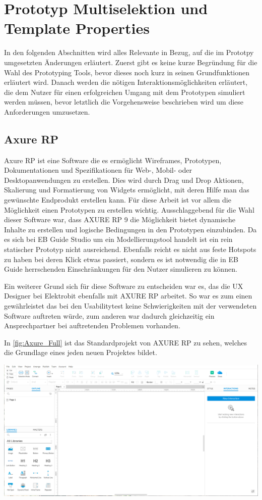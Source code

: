\section {Prototyp Multiselektion und Template Properties}
In den folgenden Abschnitten wird alles Relevante in Bezug, auf die im Prototpy umgesetzten Änderungen erläutert.
Zuerst gibt es keine kurze Begründung für die Wahl des Prototyping Tools, bevor dieses noch kurz in seinen Grundfunktionen erläutert wird.
Danach werden die nötigen Interaktionsmöglichkeiten erläutert, die dem Nutzer für einen erfolgreichen Umgang mit dem Prototypen simuliert werden müssen, bevor letztlich die Vorgehensweise beschrieben wird um diese Anforderungen umzusetzen.

\subsection {Axure RP}
Axure RP ist eine Software die es ermöglicht Wireframes, Prototypen, Dokumentationen und Spezifikationen für Web-, Mobil- oder Desktopanwendungen zu erstellen.
Dies wird durch Drag und Drop Aktionen, Skalierung und Formatierung von Widgets ermöglicht, mit deren Hilfe man das gewünschte Endprodukt erstellen kann.
Für diese Arbeit ist vor allem die Möglichkeit einen Prototypen zu erstellen wichtig.
Ausschlaggebend für die Wahl dieser Software war, dass AXURE RP 9 die Möglichkeit bietet dynamische Inhalte zu erstellen und logische Bedingungen in den Prototypen einzubinden.
Da es sich bei EB Guide Studio um ein Modellierungstool handelt ist ein rein statischer Prototyp nicht ausreichend.
Ebenfalls reicht es nicht aus feste Hotspots zu haben bei deren Klick etwas passiert, sondern es ist notwendig die in EB Guide herrschenden Einschränkungen für den Nutzer simulieren zu können.

Ein weiterer Grund sich für diese Software zu entscheiden war es, das die UX Designer bei Elektrobit ebenfalls mit AXURE RP arbeitet.
So war es zum einen gewährleistet das bei den Usabilitytest keine Schwierigkeiten mit der verwendeten Software auftreten würde, zum anderen war dadurch gleichzeitig ein Ansprechpartner bei auftretenden Problemen vorhanden.

In \cref{fig:Axure_Full} ist das Standardprojekt von AXURE RP zu sehen, welches die Grundlage eines jeden neuen Projektes bildet.

\begin{center}
  \includegraphics[scale=0.4]{figures/Axure_Full.png}
  \label{fig:Axure_Full}
\end{center}

